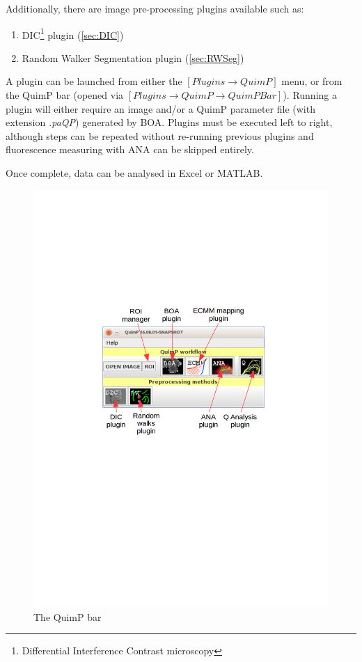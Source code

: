 \documentclass[a4paper,12pt]{article}
\begin{document}
Additionally, there are image pre-processing plugins available such as:

\begin{enumerate}
	\item DIC\footnote{Differential Interference Contrast microscopy} plugin (\autoref{sec:DIC})
	\item Random Walker Segmentation plugin (\autoref{sec:RWSeg})
\end{enumerate}

A plugin can be launched from either the $[Plugins\rightarrow QuimP]$ menu, or from the QuimP bar
(opened via $[Plugins\rightarrow QuimP\rightarrow QuimP Bar]$).
Running a plugin will either require an image and/or a QuimP parameter file (with extension \textit{.paQP}) generated by BOA.
Plugins must be executed left to right, although steps can be repeated without re-running previous plugins and fluorescence measuring with ANA can be skipped entirely.

Once complete, data can be analysed in Excel or MATLAB.

\begin{figure}[ht]
   \centering
   \includegraphics[width=15cm]{quimpBar.png} %
   \caption{The QuimP bar}
   \label{quimpBar}
\end{figure}
\end{document}
